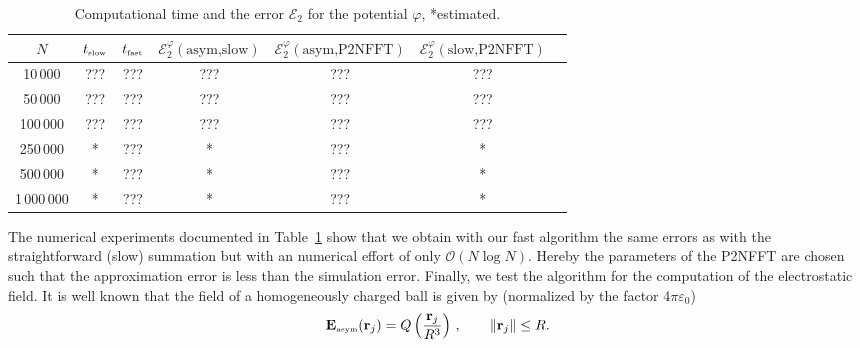\begin{table}[htb]
  \centering
  \begin{tabular}{|c||c|c|c|c|c|c|}
    \hline \rule{0mm}{5mm}
    $N$ & $t_{\mbox{\tiny slow}}$  &   $t_{\mbox{\tiny fast}}$
    &$\mathcal{E}_{2}^{\varphi}(\mbox{asym,slow})$
    &$\mathcal{E}_{2}^{\varphi}(\mbox{asym,P2NFFT})$
    &$\mathcal{E}_{2}^{\varphi}(\mbox{slow,P2NFFT})$  \\ \hline
    10\,000     & ??? & ??? & ??? & ??? &  ??? \\ \hline
    50\,000     & ??? & ??? & ??? & ??? &  ??? \\ \hline
    100\,000    & ??? & ??? & ??? & ??? &  ??? \\ \hline
    250\,000    & *   & ??? & *   & ??? &  *   \\ \hline
    500\,000    & *   & ??? & *   & ??? &  *   \\ \hline
    1\,000\,000 & *   & ??? & *   & ??? &  *   \\ \hline
  \end{tabular}
  \caption{Computational time and the error $\mathcal{E}_{2}$ for the potential $\varphi$, *estimated.\label{e2_potential}}
\end{table}
%
The numerical experiments documented in Table~\ref{e2_potential} show
that we obtain with our fast algorithm the same errors as with the
straightforward (slow) summation but with an numerical effort of only
$\mathcal{O}(N\log N)$. Hereby the parameters of the P2NFFT are chosen
such that the approximation error is less than the simulation error.
Finally, we test the algorithm for the computation of the
electrostatic field.  It is well known that the field of a
homogeneously charged ball is given by (normalized by the factor
$4\pi\varepsilon_0$)
\[
  \mathbf E_{\mbox {\tiny asym}}(\mathbf r_j)
  = Q \left( \frac{\mathbf r_j}{R^3}\right)\,,\qquad \|\mathbf r_j\|\leq R.
\]



